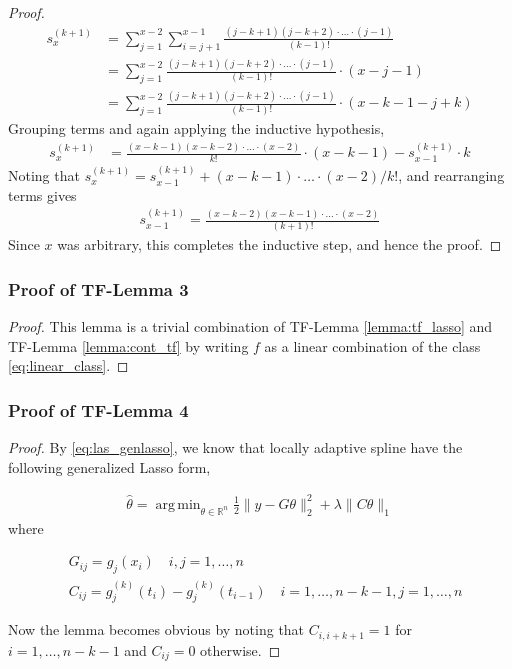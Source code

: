 \documentclass[a4paper]{article}
\DeclareMathOperator*{\argmin}{arg\,min}
\newcommand{\RR}{\mathbb{R}}
\begin{document}
\begin{proof}
\begin{align*}
s_x^{(k+1)} &= \sum_{j=1}^{x-2}\sum_{i=j+1}^{x-1}\frac{(j-k+1)(j-k+2)\cdot\ldots\cdot(j-1)}{(k-1)!}\\
&= \sum_{j=1}^{x-2} \frac{(j-k+1)(j-k+2)\cdot\ldots\cdot(j-1)}{(k-1)!}\cdot(x-j-1)\\
&= \sum_{j=1}^{x-2}\frac{(j-k+1)(j-k+2)\cdot\ldots\cdot(j-1)}{(k-1)!}\cdot(x-k-1-j+k)
\end{align*}
Grouping terms and again applying the inductive hypothesis,
\begin{align*}
s_x^{(k+1)} &= \frac{(x-k-1)(x-k-2)\cdot\ldots\cdot(x-2)}{k!}\cdot(x-k-1)-s_{x-1}^{(k+1)}\cdot k
\end{align*}
Noting that $s_x^{(k+1)} = s_{x-1}^{(k+1)}+(x-k-1)\cdot\ldots\cdot(x-2)/k!$, and rearranging terms gives
\begin{align*}
s_{x-1}^{(k+1)} = \frac{(x-k-2)(x-k-1)\cdot\ldots\cdot(x-2)}{(k+1)!}
\end{align*}
Since $x$ was arbitrary, this completes the inductive step, and hence the proof.
\end{proof}

\subsubsection{Proof of TF-Lemma 3}
\begin{proof}
This lemma is a trivial combination of TF-Lemma \ref{lemma:tf_lasso} and TF-Lemma \ref{lemma:cont_tf} by writing $f$ as a linear combination of the class \eqref{eq:linear_class}.
\end{proof}

\subsubsection{Proof of TF-Lemma 4}
\begin{proof}
By \eqref{eq:las_genlasso}, we know that locally adaptive spline have the following generalized Lasso form,

\begin{align*}
\hat{\theta} = \argmin_{\theta\in\RR^n} \frac{1}{2}\|y-G\theta\|_2^2 + \lambda\|C\theta\|_1
\end{align*}
where 

\begin{align*}
&G_{ij} = g_j(x_i) \quad i,j = 1,\ldots, n\\
&C_{ij} = g_j^{(k)}(t_i) - g_j^{(k)}(t_{i-1}) \quad i = 1,\ldots, n-k-1, j= 1,\ldots, n
\end{align*}

Now the lemma becomes obvious by noting that $C_{i, i+k+1} =1$ for $i = 1,\ldots, n-k-1$ and $C_{ij} = 0$ otherwise. 
\end{proof}
\end{document}
